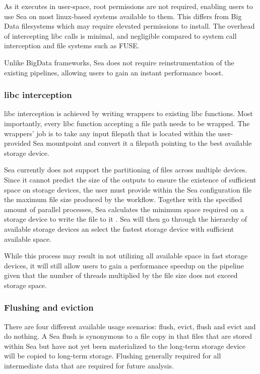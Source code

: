 As it executes in user-space, root permissions are not required, enabling users to use Sea on most linux-based systems
available to them. This differs from Big Data filesystems which may require elevated permissions to install.
The overhead of intercepting libc calls
is minimal, and negligible compared to system call interception and file systems such as FUSE.

Unlike BigData frameworks, Sea does not require reinstrumentation of the existing pipelines, allowing
users to gain an instant performance boost.

\subsubsection{libc interception}

libc interception is achieved by writing wrappers to existing libc functions. Most importantly, every
libc function accepting a file path needs to be wrapped. The wrappers' job is to take any input filepath
that is located within the user-provided Sea mountpoint and convert it a filepath pointing to the best available storage device.

Sea currently does not support the partitioning of files across multiple devices. Since it cannot predict the size of the outputs to ensure the
existence of sufficient space on storage devices, the user must provide within the Sea configuration file the maximum file size produced by the workflow.
Together with the specified amount of parallel processes, Sea calculates the minimum space required on a storage device to write the file to it .
Sea will then go through the hierarchy of available storage devices an select the fastest storage device with sufficient available space.

While this process may result in not utilizing all available space in fast storage devices, it will still allow users to gain a performance speedup on the pipeline given that the
number of threads multiplied by the file size does not exceed storage space.


\subsubsection{Flushing and eviction}
There are four different available usage scenarios: flush, evict, flush and evict and do nothing.
A Sea flush is synonymous to a file copy in that files that are stored within Sea but have not yet been materialized
to the long-term storage device will be copied to long-term storage. Flushing generally required for all intermediate data
that are required for future analysis.

